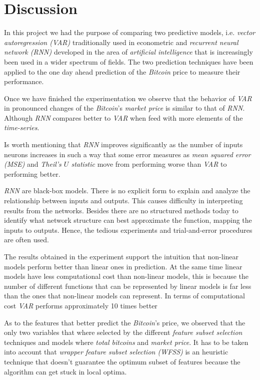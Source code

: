 
\chapter{Discussion}
\label{ch:discussion}

In this project we had the purpose of comparing two predictive models,
i.e. \textit{vector autoregression (VAR)} traditionally used in
econometric and \textit{recurrent neural network (RNN)} developed in
the area of \textit{artificial intelligence} that is increasingly been
used in a wider spectrum of fields. The two prediction techniques have
been applied to the one day ahead prediction of the \textit{Bitcoin}
price to measure their performance.

Once we have finished the experimentation we observe that the behavior
of \textit{VAR} in pronounced changes of the \textit{Bitcoin}'s
\textit{market price} is similar to that of \textit{RNN}. Although
\textit{RNN} compares better to \textit{VAR} when feed with more
elements of the \textit{time-series}.

Is worth mentioning that \textit{RNN} improves significantly as the
number of inputs neurons increases in such a way that some error
measures as \textit{mean squared error (MSE)} and \textit{Theil's $U$
statistic} move from performing worse than \textit{VAR} to performing
better.

\textit{RNN} are black-box models. There is no explicit form to
explain and analyze the relationship between inputs and outputs. This
causes difficulty in interpreting results from the networks. Besides
there are no structured methods today to identify what network
structure can best approximate the function, mapping the inputs to
outputs. Hence, the tedious experiments and trial-and-error procedures
are often used.

The results obtained in the experiment support the intuition that
non-linear models perform better than linear ones in prediction. At
the same time linear models have less computational cost than
non-linear models, this is because the number of different functions
that can be represented by linear models is far less than the ones
that non-linear models can represent. In terms of computational cost
\textit{VAR} performs approximately 10 times better

As to the features that better predict the \textit{Bitcoin}'s price,
we observed that the only two variables that where selected by the
different \textit{feature subset selection} techniques and models
where \textit{total bitcoins} and \textit{market price}. It has to be
taken into account that \textit{wrapper feature subset selection
(WFSS)} is an heuristic technique that doesn't guarantee the optimum
subset of features because the algorithm can get stuck in local
optima.


